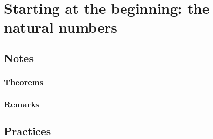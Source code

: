 \section{Starting at the beginning: the natural numbers}
\subsection{Notes}
\subsubsection{Theorems}

\subsubsection{Remarks}

\subsection{Practices}